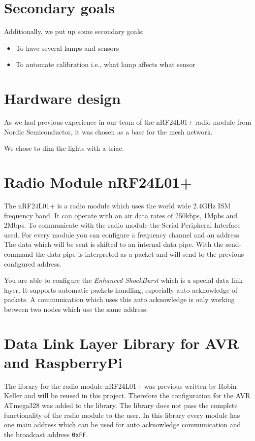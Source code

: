 \documentclass[11pt]{article}
\begin{document}
	\section{Secondary goals}
   Additionally, we put up some secondary goals:
	\begin{itemize}
		\item To have several lamps and sensors
		\item To automate calibration i.e., what lamp affects what sensor
	\end{itemize}

   \section{Hardware design}
   As we had previous experience in our team of the nRF24L01+ radio module from
   Nordic Semiconductor, it was chosen as a base for the mesh network.

   We chose to dim the lights with a triac.
   
   \section{Radio Module nRF24L01+}
   The nRF24L01+ is a radio module which uses the world wide 2.4GHz ISM frequency band. It can operate with an air data rates of 250kbps, 1Mpbs and 2Mbps. To communicate with the radio module the Serial Peripheral Interface used. For every module you can configure a frequency channel and an address. The data which will be sent is shifted to an internal data pipe. With the send-command the data pipe is interpreted as a packet and will send to the previous configured address.
   
   You are able to configure the \textit{Enhanced ShockBurst\texttrademark} which is a special data link layer. It supports automatic packets handling, especially auto acknowledge of packets.
   A communication which uses this auto acknowledge is only working between two nodes which use the same address.
   
   \section{Data Link Layer Library for AVR and RaspberryPi}
   The library for the radio module nRF24L01+ was previous written by Robin Keller and will be reused in this project. Therefore the configuration for the AVR ATmega328 was added to the library.
   The library does not pass the complete functionality of the radio module to the user. In this library every module has one main address which can be used for auto acknowledge communication and the broadcast address \texttt{0xFF}.
   
\end{document}
